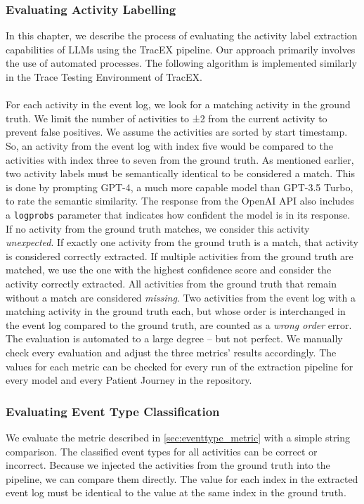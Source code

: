 \subsubsection{Evaluating Activity Labelling}\label{sec:eval_activity}
In this chapter, we describe the process of evaluating the activity label extraction capabilities of LLMs using the TracEX pipeline. Our approach primarily involves the use of automated processes. The following algorithm is implemented similarly in the Trace Testing Environment of TracEX.\\\\
For each activity in the event log, we look for a matching activity in the ground truth. We limit the number of activities to ±2 from the current activity to prevent false positives. We assume the activities are sorted by start timestamp. So, an activity from the event log with index five would be compared to the activities with index three to seven from the ground truth. As mentioned earlier, two activity labels must be semantically identical to be considered a match. This is done by prompting GPT-4, a much more capable model than GPT-3.5 Turbo, to rate the semantic similarity. The response from the OpenAI API also includes a \verb|logprobs| parameter that indicates how confident the model is in its response. If no activity from the ground truth matches, we consider this activity \emph{unexpected}. If exactly one activity from the ground truth is a match, that activity is considered correctly extracted. If multiple activities from the ground truth are matched, we use the one with the highest confidence score and consider the activity correctly extracted.  All activities from the ground truth that remain without a match are considered \emph{missing}. Two activities from the event log with a matching activity in the ground truth each, but whose order is interchanged in the event log compared to the ground truth, are counted as a \emph{wrong order} error.\\
The evaluation is automated to a large degree – but not perfect. We manually check every evaluation and adjust the three metrics' results accordingly. The values for each metric can be checked for every run of the extraction pipeline for every model and every Patient Journey in the repository.

\subsubsection{Evaluating Event Type Classification}\label{sec:eval_event_type}We evaluate the metric described in \autoref{sec:eventtype_metric} with a simple string comparison. The classified event types for all activities can be correct or incorrect. Because we injected the activities from the ground truth into the pipeline, we can compare them directly. The value for each index in the extracted event log must be identical to the value at the same index in the ground truth.

